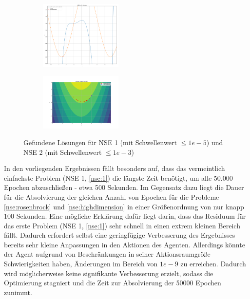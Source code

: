 \documentclass{article}
\theoremstyle{newline}
\begin{document}
\begin{onehalfspace}
\begin{figure}[h]
	\centering
	\begin{subfigure}
		\centering
		\includegraphics[width=0.45\textwidth]{Bilder/solutions_nse1.png}
		\label{fig:solutions_nse1}
	\end{subfigure}
	\hfill
	\begin{subfigure}
		\centering
		\includegraphics[width=0.45\textwidth]{Bilder/solutions_nse2.png}
		\label{fig:solutions_nse2}
	\end{subfigure}
	\caption{Gefundene Lösungen für NSE 1 (mit Schwellenwert $\leq 1e-5$) und NSE 2 (mit Schwellenwert $\leq 1e-3$)}
	\label{fig:solutions_nse1_nse2}
\end{figure}


In den vorliegenden Ergebnissen fällt besonders auf, dass das vermeintlich einfachste Problem (NSE 1, \ref{nse:1}) die längste Zeit benötigt, um alle 50.000 Epochen abzuschließen - etwa 500 Sekunden. Im Gegensatz dazu liegt die Dauer für die Absolvierung der gleichen Anzahl von Epochen für die Probleme \ref{nse:rosenbrock} und \ref{nse:highdimension} in einer Größenordnung von nur knapp 100 Sekunden. Eine mögliche Erklärung dafür liegt darin, dass das Residuum für das erste Problem (NSE 1, \ref{nse:1}) sehr schnell in einen extrem kleinen Bereich fällt. Dadurch erfordert selbst eine geringfügige Verbesserung des Ergebnisses bereits sehr kleine Anpassungen in den Aktionen des Agenten. Allerdings könnte der Agent aufgrund von Beschränkungen in seiner Aktionsraumgröße Schwierigkeiten haben, Änderungen im Bereich von $1e-9$ zu erreichen. Dadurch wird möglicherweise keine signifikante Verbesserung erzielt, sodass die Optimierung stagniert und die Zeit zur Absolvierung der 50000 Epochen zunimmt. 


\end{onehalfspace}
\end{document}
